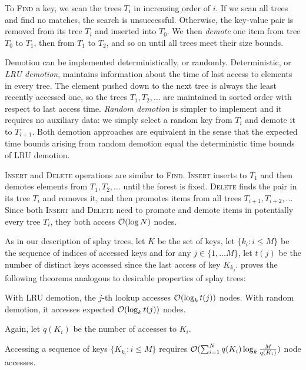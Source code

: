 To \textsc{Find} a key, we scan the trees $T_i$ in increasing order of $i$.
If we scan all trees and find no matches, the search is unsuccessful.
Otherwise, the key-value pair is removed from its tree $T_i$ and inserted
into $T_0$. We then \emph{demote} one item from tree $T_0$ to $T_1$,
then from $T_1$ to $T_2$, and so on until all trees meet their size bounds.

Demotion can be implemented deterministically, or randomly.
Deterministic, or \emph{LRU demotion}, maintains information about the time
of last access to elements in every tree. The element pushed down to the next
tree is always the least recently accessed one, so the trees $T_1,T_2,\ldots$
are maintained in sorted order with respect to last access time.
\emph{Random demotion} is simpler to implement and it requires no auxiliary
data: we simply select a random key from $T_i$ and demote it to $T_{i+1}$.
Both demotion approaches are equivalent in the sense that the expected time
bounds arising from random demotion equal the deterministic time bounds of
LRU demotion.

\textsc{Insert} and \textsc{Delete} operations are similar to \textsc{Find}.
\textsc{Insert} inserts to $T_1$ and then demotes elements from $T_1,T_2,\ldots$
until the forest is fixed.
\textsc{Delete} finds the pair in its tree $T_i$ and removes it, and
then promotes items from all trees $T_{i+1},T_{i+2},\ldots$
Since both \textsc{Insert} and \textsc{Delete} need to promote and demote items
in potentially every tree $T_i$, they both access $\mathcal{O}(\log N)$ nodes.

As in our description of splay trees, let $K$ be the set of keys,
let $\{k_i: i\leq M\}$ be the sequence of indices of accessed keys and
for any $j\in\{1,\ldots M\}$, let $t(j)$ be the number of distinct
keys accessed since the last access of key $K_{k_j}$.
\cite{martel} proves the following theorems analogous to desirable properties
of splay trees:
\begin{theorem}
	With LRU demotion, the $j$-th lookup accesses $\mathcal{O}(\log_k t(j))$ nodes.
	With random demotion, it accesses expected $\mathcal{O}(\log_k t(j))$ nodes.
\end{theorem}

Again, let $q(K_i)$ be the number of accesses to $K_i$.
\begin{theorem}
	Accessing a sequence of keys $\{K_{k_i}: i\leq M\}$ requires
	$\mathcal{O}(\sum_{i=1}^N q(K_i) \log_k \frac{M}{q(K_i)})$ node accesses.
\end{theorem}

